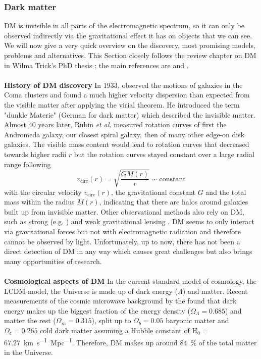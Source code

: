 \subsubsection{Dark matter}
\ac{DM} is invisible in all parts of the electromagnetic spectrum, so it can only be observed indirectly via the gravitational effect it has on objects that we can see. We will now give a very quick overview on the discovery, most promising models, problems and alternatives. This Section closely follows the review chapter on \ac{DM} in Wilma Trick's PhD thesis \citep{Wilmathesis}; the main references are \citet{Ostriker...DM...2003, Maoz...astrophysics...2007} and \citet{Mo...galformev...2010}. \\
\\\textbf{History of \ac{DM} discovery} In 1933, \citeauthor{Zwicky...DM...1933} observed the motions of galaxies in the Coma clusters and found a much higher velocity dispersion than expected from the visible matter after applying the virial theorem. He introduced the term "dunkle Materie" (German for dark matter) which described the invisible matter. Almost 40 years later, Rubin \textit{et al.} \citeyearpar{Rubin...DM...1970, Rubin...DM...1978, Rubin...DM...1980} measured rotation curves of first the Andromeda galaxy, our closest spiral galaxy, then of many other edge-on disk galaxies. The visible mass content would lead to rotation curves that decreased towards higher radii $r$ but the rotation curves stayed constant over a large radial range following 
\begin{equation}\label{eq:circ_vel}
    v_{\mathrm{circ}}(r) = \sqrt{\frac{GM(r)}{r}} \sim \mathrm{constant}
\end{equation}
with the circular velocity $v_\mathrm{{circ}}(r)$, the gravitational constant $G$ and the total mass within the radius $M(r)$, indicating that there are halos around galaxies built up from invisible matter. Other observational methods also rely on \ac{DM}, such as strong (e.g. \citealp{Trick..stronglensing...2016}) and weak gravitational lensing \citep{Tyson...weaklensing...1990, Kaiser...weaklensing...1993}. \ac{DM} seems to only interact via gravitational forces but not with electromagnetic radiation and therefore cannot be observed by light. Unfortunately, up to now, there has not been a direct detection of \ac{DM} in any way which causes great challenges but also brings many opportunities of research.\\
\\\textbf{Cosmological aspects of \ac{DM}}
In the current standard model of cosmology, the \ac{LCDM}-model, the Universe is made up of dark energy ($\Lambda$) and matter. Recent measurements of the cosmic microwave background by the \citet{Planck...CMB...2018} found that dark energy makes up the biggest fraction of the energy density ($\Omega_\Lambda = 0.685$) and matter the rest ($\Omega_m = 0.315$), split up to $\Omega_b = 0.05$ baryonic matter and $\Omega_c = 0.265$ cold dark matter assuming a Hubble constant of H$_0$ =  \SI{67.27}{km.s^{-1}.Mpc^{-1}}. Therefore, \ac{DM} makes up around \SI{84}{\%} of the total matter in the Universe. \\

